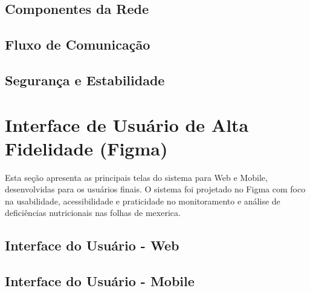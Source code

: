 \documentclass[
    a4paper,
    12pt,
    english,
    brazilian
]{article}
\begin{document}
    \subsection{\textbf{Componentes da Rede}}
    \label{sect:Componentes-da-Rede}
    

    \subsection{\textbf{Fluxo de Comunicação}}
    \label{sect:Fluxo-de-comunicacao}
    

    \subsection{\textbf{Segurança e Estabilidade}}
    \label{sect:Seguranca-e-estabilidade}
    

\section{Interface de Usuário de Alta Fidelidade (Figma)}
Esta seção apresenta as principais telas do sistema para Web e Mobile, desenvolvidas para os usuários
finais. O sistema foi projetado no Figma com foco na usabilidade, acessibilidade e 
praticidade no monitoramento e análise de deficiências nutricionais nas folhas de mexerica.
\medskip    

    \subsection{\textbf{Interface do Usuário - Web}}
    \label{sect:Interface-Web}
    

    \subsection{\textbf{Interface do Usuário - Mobile}}
    \label{sect:Interface-Mobile}
    

\end{document}
